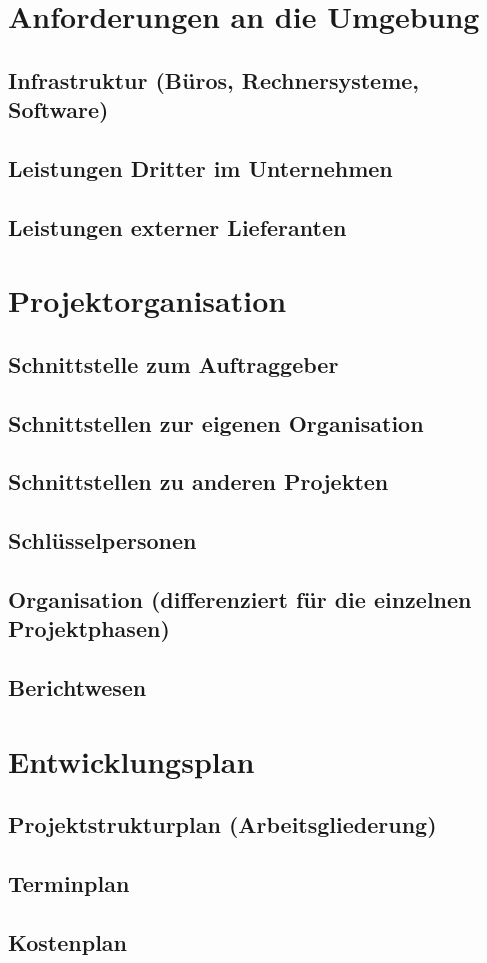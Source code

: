 \documentclass[a4paper,10pt]{scrartcl}
\begin{document}
\section{Anforderungen an die Umgebung}
\subsection{Infrastruktur (Büros, Rechnersysteme, Software)}
\subsection{Leistungen Dritter im Unternehmen}
\subsection{Leistungen externer Lieferanten}




\section{Projektorganisation}
\subsection{Schnittstelle zum Auftraggeber}
\subsection{Schnittstellen zur eigenen Organisation}
\subsection{Schnittstellen zu anderen Projekten}
\subsection{Schlüsselpersonen}
\subsection{Organisation (differenziert für die einzelnen Projektphasen)}
\subsection{Berichtwesen}


\section{Entwicklungsplan}
\subsection{Projektstrukturplan (Arbeitsgliederung)}
\subsection{Terminplan}
\subsection{Kostenplan}
\end{document}
